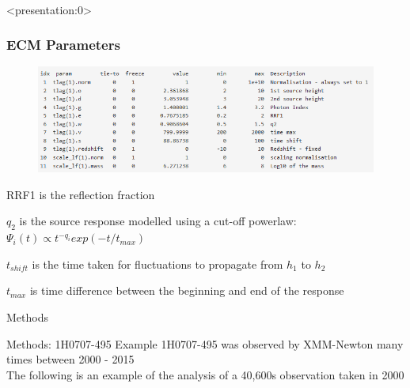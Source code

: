 \documentclass[]{beamer}
\begin{document}
\
\begin{frame} <presentation:0>
\frametitle{ECM Parameters}
\begin{figure} \centering
\includegraphics[scale=.55]{2bm_param.png}
\end{figure}
\begin{itemize}
{\footnotesize  
    \item RRF1 is the reflection fraction
    \item $q_2$ is the source response modelled using a cut-off powerlaw: $\Psi_i(t) \propto t^{-q_i} exp(-t/t_{max})$
    \item $t_{shift} $ is the time taken for fluctuations to propagate from $h_1$ to $h_2$
    \item $t_{max}$ is time difference between the beginning and end of the response
    }
\end{itemize}
\end{frame}


\begin{frame}{}
\centering
Methods 
\end{frame}

\begin{frame}{Methods: 1H0707-495 Example}
\centering
1H0707-495 was observed by XMM-Newton many times between 2000 - 2015\\
\vspace{0.5cm}
The following is an example of the analysis of a 40,600s observation taken in 2000
\end{frame}
\end{document}
